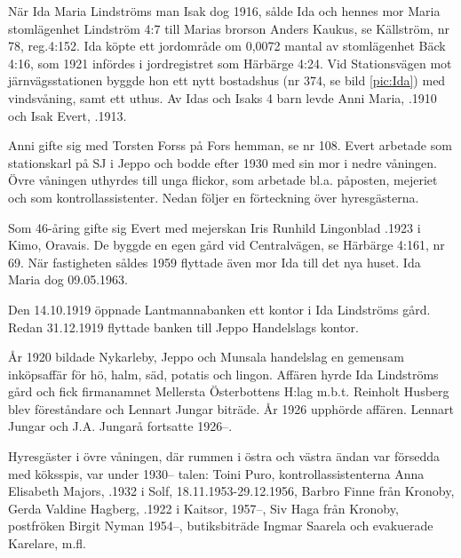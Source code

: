 %
När Ida Maria Lindströms man Isak dog 1916, sålde Ida och hennes mor Maria stomlägenhet Lindström 4:7 till Marias brorson Anders Kaukus, se Källström, nr 78, reg.4:152. Ida köpte ett jordområde om 0,0072 mantal av stomlägenhet Bäck 4:16, som 1921 infördes i jordregistret som Härbärge 4:24. Vid Stationsvägen mot järnvägsstationen byggde hon ett nytt bostadshus (nr 374, se bild \ref{pic:Ida}) med vindsvåning, samt ett uthus. Av Idas och Isaks 4 barn levde Anni Maria, .1910 och Isak Evert, .1913.

Anni gifte sig med Torsten Forss på Fors hemman, se nr 108. Evert arbetade som stationskarl på SJ i Jeppo och bodde efter 1930 med sin mor i nedre våningen. Övre våningen uthyrdes till unga flickor, som arbetade bl.a. påposten, mejeriet och som kontrollassistenter. Nedan följer en förteckning över hyresgästerna.

Som 46-åring gifte sig Evert med mejerskan Iris Runhild Lingonblad .1923 i Kimo, Oravais. De byggde en egen gård vid Centralvägen, se Härbärge 4:161, nr 69. När fastigheten såldes 1959 flyttade även mor Ida till det nya huset. Ida Maria dog 09.05.1963.

Den 14.10.1919 öppnade Lantmannabanken ett kontor i Ida Lindströms gård. Redan 31.12.1919 flyttade banken till Jeppo Handelslags kontor.

År 1920 bildade Nykarleby, Jeppo och Munsala handelslag en gemensam inköpsaffär för hö, halm, säd, potatis och lingon. Affären hyrde Ida Lindströms gård och fick firmanamnet Mellersta Österbottens H:lag m.b.t. Reinholt Husberg blev föreståndare och Lennart Jungar biträde. År 1926 upphörde affären. Lennart Jungar och J.A. Jungarå fortsatte 1926--.

Hyresgäster i övre våningen, där rummen i östra och västra ändan var försedda med köksspis, var under 1930-- talen:
Toini Puro, kontrollassistenterna Anna Elisabeth Majors, .1932 i Solf, 18.11.1953-29.12.1956, Barbro Finne från Kronoby, Gerda Valdine Hagberg, .1922 i Kaitsor, 1957--, Siv Haga från Kronoby, postfröken Birgit Nyman 1954--, butiksbiträde Ingmar Saarela och evakuerade Karelare, m.fl.



%

